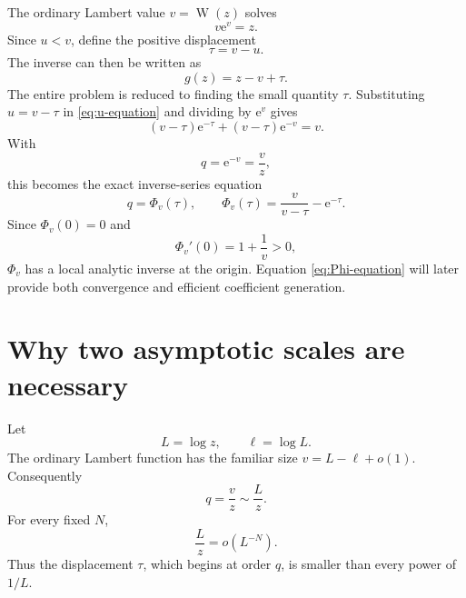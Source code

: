 \documentclass[11pt,oneside]{article}
\theoremstyle{plain}
\theoremstyle{definition}
\theoremstyle{remark}
\newcommand{\W}{\operatorname{W}}
\newcommand{\e}{\mathrm{e}}
\begin{document}
The ordinary Lambert value \(v=\W(z)\) solves
\begin{equation}
 v\e^v=z.
 \label{eq:v-equation}
\end{equation}
Since \(u<v\), define the positive displacement
\begin{equation}
 \tau=v-u.
 \label{eq:tau-def}
\end{equation}
The inverse can then be written as
\begin{equation}
 g(z)=z-v+\tau.
 \label{eq:g-zv-tau}
\end{equation}
The entire problem is reduced to finding the small quantity \(\tau\).
Substituting \(u=v-\tau\) in \eqref{eq:u-equation} and dividing by \(\e^v\)
gives
\begin{equation}
 (v-\tau)\e^{-\tau}+(v-\tau)\e^{-v}=v.
 \label{eq:tau-before}
\end{equation}
With
\begin{equation}
 q=\e^{-v}=\frac{v}{z},
 \label{eq:q-def}
\end{equation}
this becomes the exact inverse-series equation
\begin{equation}
 q=\Phi_v(\tau),
 \qquad
 \Phi_v(\tau)=\frac{v}{v-\tau}-\e^{-\tau}.
 \label{eq:Phi-equation}
\end{equation}
Since \(\Phi_v(0)=0\) and
\begin{equation}
 \Phi_v'(0)=1+\frac1v>0,
 \label{eq:Phi-derivative}
\end{equation}
\(\Phi_v\) has a local analytic inverse at the origin.  Equation
\eqref{eq:Phi-equation} will later provide both convergence and efficient
coefficient generation.

\section{Why two asymptotic scales are necessary}
\label{sec:scales}

Let
\begin{equation}
 L=\log z,
 \qquad \ell=\log L.
 \label{eq:logs}
\end{equation}
The ordinary Lambert function has the familiar size
\(v=L-\ell+o(1)\).  Consequently
\begin{equation}
 q=\frac{v}{z}\sim\frac{L}{z}.
 \label{eq:q-size}
\end{equation}
For every fixed \(N\),
\begin{equation}
 \frac{L}{z}=o(L^{-N}).
 \label{eq:beyond-all-orders}
\end{equation}
Thus the displacement \(\tau\), which begins at order \(q\), is smaller than
every power of \(1/L\).
\end{document}
